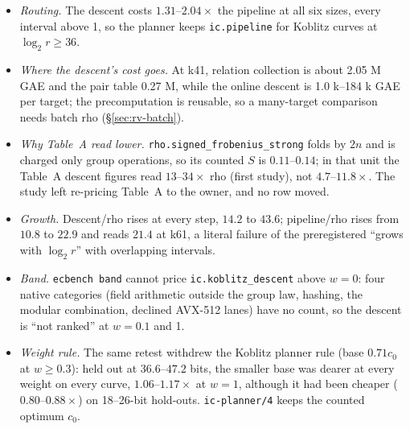 \begin{itemize}
\item \emph{Routing.} The descent costs $1.31$--$2.04\times$ the pipeline at
  all six sizes, every interval above 1, so the planner keeps
  \texttt{ic.pipeline} for Koblitz curves at $\log_2r\ge36$.
\item \emph{Where the descent's cost goes.} At k41, relation collection is
  about 2.05 M GAE and the pair table 0.27 M, while the online descent is
  1.0 k--184 k GAE per target; the precomputation is reusable, so a
  many-target comparison needs batch rho (\S\ref{sec:rv-batch}).
\item \emph{Why Table~A read lower.} \texttt{rho.signed\_frobenius\_strong}
  folds by $2n$ and is charged only group operations, so its counted $S$ is
  $0.11$--$0.14$; in that unit the Table~A descent figures read $13$--$34\times$
  rho (first study), not $4.7$--$11.8\times$. The study left re-pricing
  Table~A to the owner, and no row moved.
\item \emph{Growth.} Descent/rho rises at every step, $14.2$ to $43.6$;
  pipeline/rho rises from $10.8$ to $22.9$ and reads $21.4$ at k61, a literal
  failure of the preregistered ``grows with $\log_2r$'' with overlapping
  intervals.
\item \emph{Band.} \texttt{ecbench band} cannot price
  \texttt{ic.koblitz\_descent} above $w=0$: four native categories (field
  arithmetic outside the group law, hashing, the modular combination,
  declined AVX-512 lanes) have no count, so the descent is ``not ranked'' at
  $w=0.1$ and 1.
\item \emph{Weight rule.} The same retest withdrew the Koblitz planner rule
  (base $0.71c_0$ at $w\ge0.3$): held out at $36.6$--$47.2$ bits, the smaller
  base was dearer at every weight on every curve, $1.06$--$1.17\times$ at
  $w=1$, although it had been cheaper ($0.80$--$0.88\times$) on 18--26-bit
  hold-outs. \texttt{ic-planner/4} keeps the counted optimum $c_0$.
\end{itemize}

